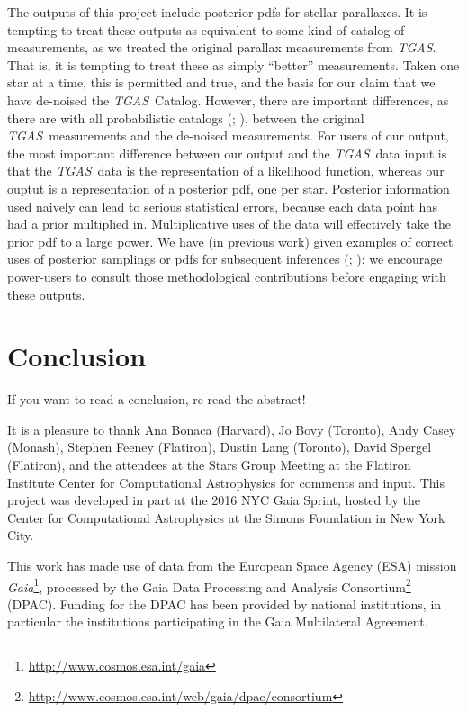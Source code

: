 \documentclass[modern]{aastex61}
\newcommand{\acronym}[1]{{\small{#1}}}
\newcommand{\project}[1]{\textsl{#1}}
\newcommand{\tgas}{\project{\acronym{TGAS}}}
\newcommand{\gaia}{\project{Gaia}}
\begin{document}
The outputs of this project include posterior pdfs for stellar parallaxes.
It is tempting to treat these outputs as equivalent to some kind of catalog of
measurements, as we treated the original parallax measurements from \tgas.
That is, it is tempting to treat these as simply ``better'' measurements.
Taken one star at a time, this is permitted and true, and the basis for our
claim that we have de-noised the \tgas\ Catalog.
However, there are important differences, as there are with all
probabilistic catalogs (\citealt{hogg11}; \citealt{portillo17}), between the
original \tgas\ measurements and the de-noised measurements.
For users of our output, the most important difference between our
output and the \tgas\ data input is that the \tgas\ data is the representation
of a likelihood function, whereas our ouptut is a
representation of a posterior pdf, one per star.
Posterior information used naively can lead to serious statistical
errors, because each data point has had a prior multiplied in.
Multiplicative uses of the data will effectively take the prior
pdf to a large power.
We have (in previous work)
given examples of correct uses of posterior samplings or pdfs
for subsequent inferences (\citealt{hogg08}; \citealt{dfm14}); we
encourage power-users to consult those methodological
contributions before engaging with these outputs.

\section{Conclusion}
If you want to read a conclusion, re-read the abstract!

\acknowledgments It is a pleasure to thank
  Ana Bonaca (Harvard),
  Jo Bovy (Toronto),
  Andy Casey (Monash),
  Stephen Feeney (Flatiron),
  Dustin Lang (Toronto),
  David Spergel (Flatiron),
and the attendees at the Stars Group Meeting at the Flatiron Institute
Center for Computational Astrophysics for comments and input.
This project was developed in part at the 2016 \acronym{NYC} Gaia Sprint, hosted
by the Center for Computational Astrophysics at the Simons Foundation
in New York City.

This work has made use of data from the European Space Agency (\acronym{ESA})
mission \gaia\footnote{\url{http://www.cosmos.esa.int/gaia}}, processed by the Gaia
Data Processing and Analysis Consortium\footnote{\url{http://www.cosmos.esa.int/web/gaia/dpac/consortium}} (\acronym{DPAC}). Funding for the
\acronym{DPAC} has been provided by national institutions, in particular the
institutions participating in the Gaia Multilateral Agreement.
\end{document}
